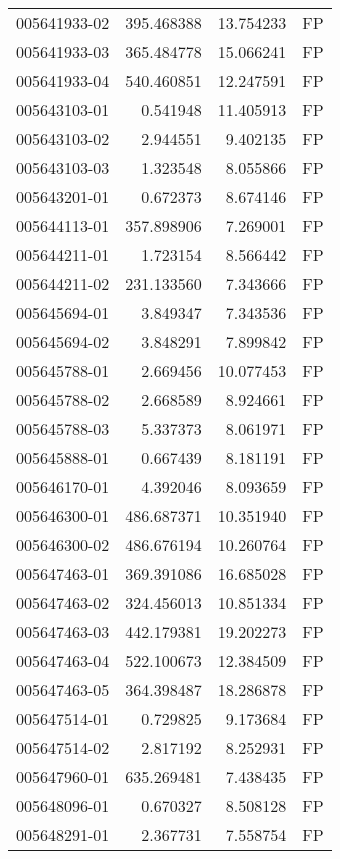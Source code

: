 \begin{tabular}{lrrl}
005641933-02 &  395.468388 &    13.754233 &   FP \\
005641933-03 &  365.484778 &    15.066241 &   FP \\
005641933-04 &  540.460851 &    12.247591 &   FP \\
005643103-01 &    0.541948 &    11.405913 &   FP \\
005643103-02 &    2.944551 &     9.402135 &   FP \\
005643103-03 &    1.323548 &     8.055866 &   FP \\
005643201-01 &    0.672373 &     8.674146 &   FP \\
005644113-01 &  357.898906 &     7.269001 &   FP \\
005644211-01 &    1.723154 &     8.566442 &   FP \\
005644211-02 &  231.133560 &     7.343666 &   FP \\
005645694-01 &    3.849347 &     7.343536 &   FP \\
005645694-02 &    3.848291 &     7.899842 &   FP \\
005645788-01 &    2.669456 &    10.077453 &   FP \\
005645788-02 &    2.668589 &     8.924661 &   FP \\
005645788-03 &    5.337373 &     8.061971 &   FP \\
005645888-01 &    0.667439 &     8.181191 &   FP \\
005646170-01 &    4.392046 &     8.093659 &   FP \\
005646300-01 &  486.687371 &    10.351940 &   FP \\
005646300-02 &  486.676194 &    10.260764 &   FP \\
005647463-01 &  369.391086 &    16.685028 &   FP \\
005647463-02 &  324.456013 &    10.851334 &   FP \\
005647463-03 &  442.179381 &    19.202273 &   FP \\
005647463-04 &  522.100673 &    12.384509 &   FP \\
005647463-05 &  364.398487 &    18.286878 &   FP \\
005647514-01 &    0.729825 &     9.173684 &   FP \\
005647514-02 &    2.817192 &     8.252931 &   FP \\
005647960-01 &  635.269481 &     7.438435 &   FP \\
005648096-01 &    0.670327 &     8.508128 &   FP \\
005648291-01 &    2.367731 &     7.558754 &   FP \\

\end{tabular}
